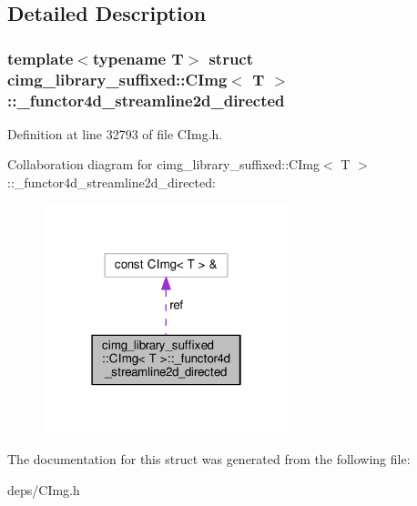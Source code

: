 \subsection{Detailed Description}
\subsubsection*{template$<$typename T$>$\newline
struct cimg\+\_\+library\+\_\+suffixed\+::\+C\+Img$<$ T $>$\+::\+\_\+functor4d\+\_\+streamline2d\+\_\+directed}



Definition at line 32793 of file C\+Img.\+h.



Collaboration diagram for cimg\+\_\+library\+\_\+suffixed\+:\+:C\+Img$<$ T $>$\+:\+:\+\_\+functor4d\+\_\+streamline2d\+\_\+directed\+:
\nopagebreak
\begin{figure}[H]
\begin{center}
\leavevmode
\includegraphics[width=202pt]{d8/d2b/structcimg__library__suffixed_1_1CImg_1_1__functor4d__streamline2d__directed__coll__graph}
\end{center}
\end{figure}


The documentation for this struct was generated from the following file\+:\begin{DoxyCompactItemize}
\item 
deps/C\+Img.\+h\end{DoxyCompactItemize}
